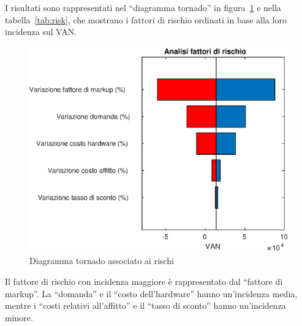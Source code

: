 I risultati sono rappresentati nel “diagramma tornado” in figura~\ref{tornado} e
nella tabella~\ref{tab:risk}, che mostrano i fattori di rischio ordinati in base
alla loro incidenza sul VAN.

%
\begin{figure}[!h]
\centering
\includegraphics[width=\textwidth]{figures/tornado}
\caption{Diagramma tornado associato ai rischi}
\label{tornado}
\end{figure}
%
Il fattore di rischio con incidenza maggiore è rappresentato dal “fattore
di markup”. La “domanda” e il “costo dell’hardware” hanno un’incidenza media,
mentre i “costi relativi all’affitto” e il “tasso di sconto” hanno un’incidenza
minore.
